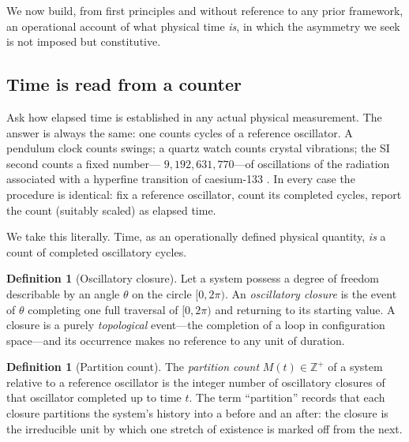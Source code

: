 \documentclass[11pt,a4paper]{article}
\theoremstyle{thmstyle}
\theoremstyle{definition}
\newtheorem{definition}[theorem]{Definition}
\theoremstyle{remark}
\newcommand{\Zp}{\mathbb{Z}^{+}}
\newcommand{\Count}{M}
\begin{document}
We now build, from first principles and without reference to any prior
framework, an operational account of what physical time \emph{is}, in
which the asymmetry we seek is not imposed but constitutive.

\subsection{Time is read from a counter}
\label{sec:time-counter}

Ask how elapsed time is established in any actual physical measurement.
The answer is always the same: one counts cycles of a reference
oscillator. A pendulum clock counts swings; a quartz watch counts
crystal vibrations; the SI second counts a fixed number---%
$9{,}192{,}631{,}770$---of oscillations of the radiation associated with
a hyperfine transition of caesium-133 \citep{essen1955}. In every case
the procedure is identical: fix a reference oscillator, count its
completed cycles, report the count (suitably scaled) as elapsed time.

We take this literally. Time, as an operationally defined physical
quantity, \emph{is} a count of completed oscillatory cycles.

\begin{definition}[Oscillatory closure]
\label{def:closure}
Let a system possess a degree of freedom describable by an angle
$\theta$ on the circle $[0,2\pi)$. An \emph{oscillatory closure} is the
event of $\theta$ completing one full traversal of $[0,2\pi)$ and
returning to its starting value. A closure is a purely \emph{topological}
event---the completion of a loop in configuration space---and its
occurrence makes no reference to any unit of duration.
\end{definition}

\begin{definition}[Partition count]
\label{def:count}
The \emph{partition count} $\Count(t)\in\Zp$ of a system relative to a
reference oscillator is the integer number of oscillatory closures of
that oscillator completed up to time $t$. The term ``partition'' records
that each closure partitions the system's history into a before and an
after: the closure is the irreducible unit by which one stretch of
existence is marked off from the next.
\end{definition}
\end{document}

